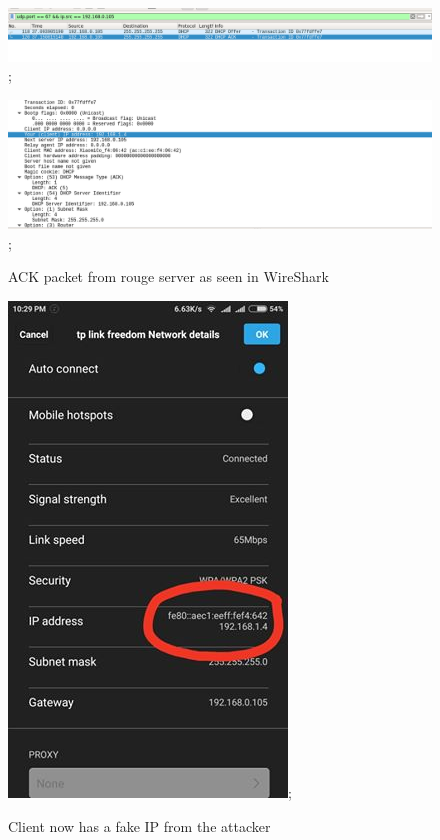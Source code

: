 \documentclass[12pt]{article}
\begin{document}
\begin{sloppypar}
       
    \newpage   
    \begin{figure}[h]
    \centering
    \includegraphics[width=15 cm,height=3 cm]{images/ack-2-1.png};
    
    \end{figure}
    
    
    \begin{figure}[h]
    \centering
    \includegraphics[width=15 cm,height=7 cm]{images/ack-2-2.png};
    \caption{ACK packet from rouge server as seen in WireShark}
    \end{figure}
    
        
    
    
    
    \newpage
    \begin{figure}[h]
    \centering
    \includegraphics[width=7 cm,height=10 cm]{images/spoofed_conn.png};
    \caption{Client now has a fake IP from the attacker}
    \end{figure}
    


\end{sloppypar}
\end{document}
